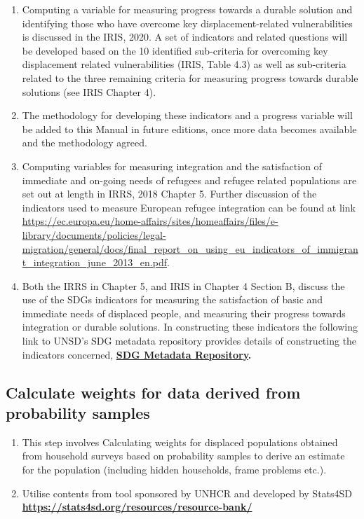 \documentclass[
]{article}
\begin{document}
\begin{enumerate}
\def\labelenumi{\arabic{enumi}.}
\setcounter{enumi}{389}
\item
  Computing a variable for measuring progress towards a durable
  solution and identifying those who have overcome key
  displacement-related vulnerabilities is discussed in the IRIS, 2020.
  A set of indicators and related questions will be developed based on
  the 10 identified sub-criteria for overcoming key displacement
  related vulnerabilities (IRIS, Table 4.3) as well as sub-criteria
  related to the three remaining criteria for measuring progress
  towards durable solutions (see IRIS Chapter 4).
\item
  The methodology for developing these indicators and a progress
  variable will be added to this Manual in future editions, once more
  data becomes available and the methodology agreed.
\item
  Computing variables for measuring integration and the satisfaction
  of immediate and on-going needs of refugees and refugee related
  populations are set out at length in IRRS, 2018 Chapter 5. Further
  discussion of the indicators used to measure European refugee
  integration can be found at link
  \url{https://ec.europa.eu/home-affairs/sites/homeaffairs/files/e-library/documents/policies/legal-migration/general/docs/final_report_on_using_eu_indicators_of_immigrant_integration_june_2013_en.pdf}.
\item
  Both the IRRS in Chapter 5, and IRIS in Chapter 4 Section B,
  discuss the use of the SDGs indicators for measuring the
  satisfaction of basic and immediate needs of displaced people, and
  measuring their progress towards integration or durable solutions.
  In constructing these indicators the following link to UNSD's SDG
  metadata repository provides details of constructing the indicators
  concerned, \textbf{\href{https://unstats.un.org/sdgs/metadata/}{SDG Metadata
  Repository}.}
\end{enumerate}

\hypertarget{calculate-weights-for-data-derived-from-probability-samples-1}{%
\subsection{Calculate weights for data derived from probability samples}\label{calculate-weights-for-data-derived-from-probability-samples-1}}

\begin{enumerate}
\def\labelenumi{\arabic{enumi}.}
\setcounter{enumi}{393}
\item
  This step involves Calculating weights for displaced populations
  obtained from household surveys based on probability samples to
  derive an estimate for the population (including hidden households,
  frame problems etc.).
\item
  Utilise contents from tool sponsored by UNHCR and developed by
  Stats4SD
  \href{https://stats4sd.org/resources/resource-bank/}{\textbf{https://stats4sd.org/resources/resource-bank/}}
\end{enumerate}
\end{document}
